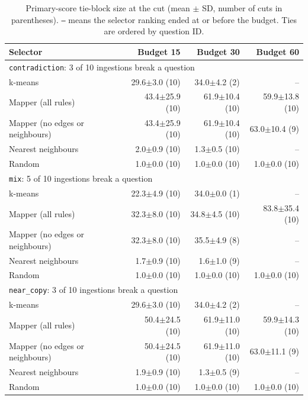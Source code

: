 \begin{table}[htbp]
  \centering
  \footnotesize
  \setlength{\tabcolsep}{4pt}
  \begin{tabular}{lrrr}
    \hline
    Selector & Budget 15 & Budget 30 & Budget 60 \\
    \hline
    \multicolumn{4}{l}{\texttt{contradiction}: 3 of 10 ingestions break a question} \\
    k-means & 29.6$\pm$3.0 (10) & 34.0$\pm$4.2 (2) & -- \\
    Mapper (all rules) & 43.4$\pm$25.9 (10) & 61.9$\pm$10.4 (10) & 59.9$\pm$13.8 (10) \\
    Mapper (no edges or neighbours) & 43.4$\pm$25.9 (10) & 61.9$\pm$10.4 (10) & 63.0$\pm$10.4 (9) \\
    Nearest neighbours & 2.0$\pm$0.9 (10) & 1.3$\pm$0.5 (10) & -- \\
    Random & 1.0$\pm$0.0 (10) & 1.0$\pm$0.0 (10) & 1.0$\pm$0.0 (10) \\
    \hline
    \multicolumn{4}{l}{\texttt{mix}: 5 of 10 ingestions break a question} \\
    k-means & 22.3$\pm$4.9 (10) & 34.0$\pm$0.0 (1) & -- \\
    Mapper (all rules) & 32.3$\pm$8.0 (10) & 34.8$\pm$4.5 (10) & 83.8$\pm$35.4 (10) \\
    Mapper (no edges or neighbours) & 32.3$\pm$8.0 (10) & 35.5$\pm$4.9 (8) & -- \\
    Nearest neighbours & 1.7$\pm$0.9 (10) & 1.6$\pm$1.0 (9) & -- \\
    Random & 1.0$\pm$0.0 (10) & 1.0$\pm$0.0 (10) & 1.0$\pm$0.0 (10) \\
    \hline
    \multicolumn{4}{l}{\texttt{near\_copy}: 3 of 10 ingestions break a question} \\
    k-means & 29.6$\pm$3.0 (10) & 34.0$\pm$4.2 (2) & -- \\
    Mapper (all rules) & 50.4$\pm$24.5 (10) & 61.9$\pm$11.0 (10) & 59.9$\pm$14.3 (10) \\
    Mapper (no edges or neighbours) & 50.4$\pm$24.5 (10) & 61.9$\pm$11.0 (10) & 63.0$\pm$11.1 (9) \\
    Nearest neighbours & 1.9$\pm$0.9 (10) & 1.3$\pm$0.5 (9) & -- \\
    Random & 1.0$\pm$0.0 (10) & 1.0$\pm$0.0 (10) & 1.0$\pm$0.0 (10) \\
    \hline
  \end{tabular}
  \caption{Primary-score tie-block size at the cut (mean $\pm$ SD, number of cuts in parentheses). \texttt{--} means the selector ranking ended at or before the budget. Ties are ordered by question ID.}
  \label{tab:main-ties}
\end{table}